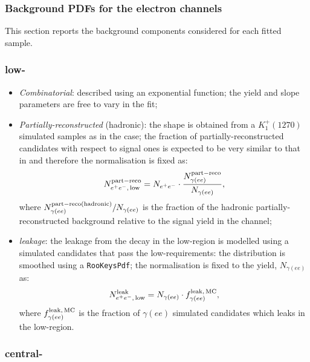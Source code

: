 \subsubsection{Background PDFs for the electron channels}
\label{sec:RKst_misreco_fit}

This section reports the background components considered for each fitted sample.

\subsubsection*{\BdToKstee low-\qsq}

\begin{itemize}

\item \textit{Combinatorial}: described using an exponential function; the yield and slope parameters are free to vary in the fit;

\item \textit{Partially-reconstructed} (hadronic): the shape is obtained from a $K_1^+(1270)$ simulated samples as in the \BdToKstGee case;
the fraction of partially-reconstructed candidates with respect to signal ones is expected to be very similar to that
in \BdToKstGee and therefore the normalisation is fixed as:
%
$$N_{e^+ e^-, \, {\rm low}}^{\rm part-reco} = N_{e^+ e^-} \cdot \frac{N_{\gamma(ee)}^{\rm part-reco}}{N_{\gamma(ee)}},$$
%
where $N_{\gamma(ee)}^{\rm part-reco (hadronic)}/N_{\gamma(ee)}$ is the fraction of the hadronic partially-reconstructed background relative to the signal yield in the \BdToKstGee channel;

\item \textit{\BdToKstG leakage}: the leakage from the \BdToKstGee decay in the low-\qsq region is modelled using a simulated candidates that pass the low-\qsq requirements: the distribution is smoothed using a \verb!RooKeysPdf!; the normalisation is fixed to the \BdToKstGee yield, $N_{\gamma(ee)}$ as:
%
$$N_{e^+ e^-, \, {\rm low}}^{\rm leak} = N_{\gamma(ee)} \cdot f_{\gamma(ee)}^{\rm leak, \,MC},$$
%
where $f_{\gamma(ee)}^{\rm leak, \,MC}$ is the fraction of $\gamma(ee)$ simulated candidates which leaks in the low-\qsq region.

\end{itemize}


\subsubsection*{\BdToKstee central-\qsq}

